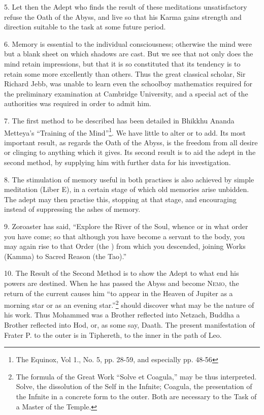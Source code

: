 5. Let then the Adept who finds the result of these meditations unsatisfactory refuse the Oath of the Abyss, and live so that his Karma gains strength and direction suitable to the task at some future period.

6. Memory is essential to the individual consciousness; otherwise the mind were but a blank sheet on which shadows are cast. But we see that not only does the mind retain impressions, but that it is so constituted that its tendency is to retain some more excellently than others. Thus the great classical scholar, Sir Richard Jebb, was unable to learn even the schoolboy mathematics required for the preliminary examination at Cambridge University, and a special act of the authorities was required in order to admit him.

7. The first method to be described has been detailed in Bhikkhu Ananda Metteya’s \enquote{Training of the Mind}\footnote{The Equinox, Vol 1., No. 5, pp. 28-59, and especially pp. 48-56}. We have little to alter or to add. Its most important result, as regards the Oath of the Abyss, is the freedom from all desire or clinging to anything which it gives. Its second result is to aid the adept in the second method, by supplying him with further data for his investigation.

8. The stimulation of memory useful in both practises is also achieved by simple meditation (Liber Ε), in a certain stage of which old memories arise unbidden. The adept may then practise this, stopping at that stage, and encouraging instead of suppressing the ashes of memory.

9. Zoroaster has said, \enquote{Explore the River of the Soul, whence or in what order you have come; so that although you have become a servant to the body, you may again rise to that Order (the \Argentium{}{}) from which you descended, joining Works (Kamma) to Sacred Reason (the Tao).}

10. The Result of the Second Method is to show the Adept to what end his powers are destined. When he has passed the Abyss and become \textsc{Nemo}, the return of the current causes him \enquote{to appear in the Heaven of Jupiter as a morning star or as an evening star.}\footnote{The formula of the Great Work \enquote{Solve et Coagula,} may be thus interpreted. Solve, the dissolution of the Self in the Infnite; Coagula, the presentation of the Infnite in a concrete form to the outer. Both are necessary to the Task of a Master of the Temple.} should discover what may be the nature of his work. Thus Mohammed was a Brother reflected into Netzach, Buddha a Brother reflected into Hod, or, as some say, Daath. The present manifestation of Frater P. to the outer is in Tiphereth, to the inner in the path of Leo.

